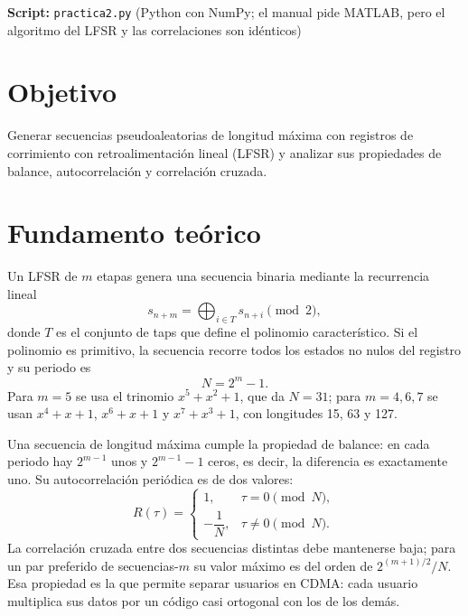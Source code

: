 \documentclass[11pt,a4paper]{article}
\begin{document}

\textbf{Script:} \texttt{practica2.py} (Python con NumPy; el manual pide MATLAB, pero el
algoritmo del LFSR y las correlaciones son idénticos)

\section{Objetivo}

Generar secuencias pseudoaleatorias de longitud máxima con registros de corrimiento con
retroalimentación lineal (LFSR) y analizar sus propiedades de balance, autocorrelación y
correlación cruzada.

\section{Fundamento teórico}

Un LFSR de $m$ etapas genera una secuencia binaria mediante la recurrencia lineal
\begin{equation}
  s_{n+m} = \bigoplus_{i \in T} s_{n+i} \pmod 2,
\end{equation}
donde $T$ es el conjunto de taps que define el polinomio característico. Si el polinomio
es primitivo, la secuencia recorre todos los estados no nulos del registro y su periodo es
\begin{equation}
  N = 2^m - 1.
\end{equation}
Para $m=5$ se usa el trinomio $x^5+x^2+1$, que da $N=31$; para $m=4,6,7$ se usan
$x^4+x+1$, $x^6+x+1$ y $x^7+x^3+1$, con longitudes 15, 63 y 127.

Una secuencia de longitud máxima cumple la propiedad de balance: en cada periodo hay
$2^{m-1}$ unos y $2^{m-1}-1$ ceros, es decir, la diferencia es exactamente uno. Su
autocorrelación periódica es de dos valores:
\begin{equation}
  R(\tau) =
  \begin{cases}
    1, & \tau = 0 \pmod N,\\
    -\dfrac{1}{N}, & \tau \neq 0 \pmod N.
  \end{cases}
\end{equation}
La correlación cruzada entre dos secuencias distintas debe mantenerse baja; para un par
preferido de secuencias-$m$ su valor máximo es del orden de $2^{(m+1)/2}/N$. Esa
propiedad es la que permite separar usuarios en CDMA: cada usuario multiplica sus datos
por un código casi ortogonal con los de los demás.
\end{document}
